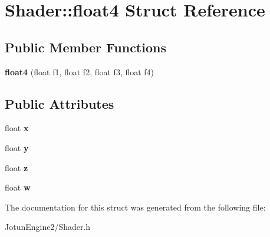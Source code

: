\hypertarget{struct_shader_1_1float4}{\section{Shader\-:\-:float4 Struct Reference}
\label{struct_shader_1_1float4}
}
\subsection*{Public Member Functions}
\begin{DoxyCompactItemize}
\item 
\hypertarget{struct_shader_1_1float4_a89a01aa3c8d885dae953bc85b0539fab}{{\bfseries float4} (float f1, float f2, float f3, float f4)}\label{struct_shader_1_1float4_a89a01aa3c8d885dae953bc85b0539fab}

\end{DoxyCompactItemize}
\subsection*{Public Attributes}
\begin{DoxyCompactItemize}
\item 
\hypertarget{struct_shader_1_1float4_ad1d5842b5f6e36156b9b695d80424fdc}{float {\bfseries x}}\label{struct_shader_1_1float4_ad1d5842b5f6e36156b9b695d80424fdc}

\item 
\hypertarget{struct_shader_1_1float4_abde865f2bbee58dd331d3927b671487b}{float {\bfseries y}}\label{struct_shader_1_1float4_abde865f2bbee58dd331d3927b671487b}

\item 
\hypertarget{struct_shader_1_1float4_a27cf54ae3e6f1edace06ae9c8c6bf328}{float {\bfseries z}}\label{struct_shader_1_1float4_a27cf54ae3e6f1edace06ae9c8c6bf328}

\item 
\hypertarget{struct_shader_1_1float4_ab3c7c423129f9304d15692e371679d11}{float {\bfseries w}}\label{struct_shader_1_1float4_ab3c7c423129f9304d15692e371679d11}

\end{DoxyCompactItemize}


The documentation for this struct was generated from the following file\-:\begin{DoxyCompactItemize}
\item 
Jotun\-Engine2/Shader.\-h\end{DoxyCompactItemize}

